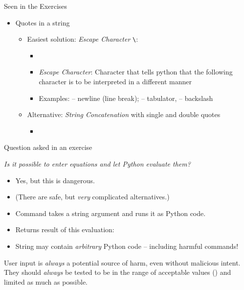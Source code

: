 
\begin{frame}[fragile]{Seen in the Exercises}
%
\begin{itemize}
\item Quotes in a string
	\begin{itemize}
	\item Easiest solution: \emph{Escape Character} \texttt{\textbackslash}:
		\begin{itemize}
		\item {}
		\item \emph{Escape Character}: Character that tells python that the following character is to be interpreted in a different manner
		\item Examples:  -- newline (line break);  -- tabulator,  -- backslash
		\end{itemize}
	\item Alternative: \emph{String Concatenation} with single and double quotes
		\begin{itemize}
		\item {}
		\end{itemize}
	\end{itemize}
\end{itemize}
%
\end{frame}


\begin{frame}[fragile]{Question asked in an exercise}
%
\begin{center}
	\begin{Large}
	\emph{Is it possible to enter equations and let Python evaluate them?}
	\end{Large}
\end{center}
%
\begin{itemize}
\item Yes, but this is dangerous.
\item (There are safe, but \emph{very} complicated alternatives.)
\item Command  takes a string argument and runs it as Python code.
\item Returns result of this evaluation: 
\item String may contain \emph{arbitrary} Python code -- including harmful commands!
\end{itemize}
%
\begin{warnbox}
User input is \emph{always} a potential source of harm, even without malicious intent. They should \emph{always} be tested to be in the range of acceptable values (\Thus {}) and limited as much as possible.
\end{warnbox}
%
\end{frame}

